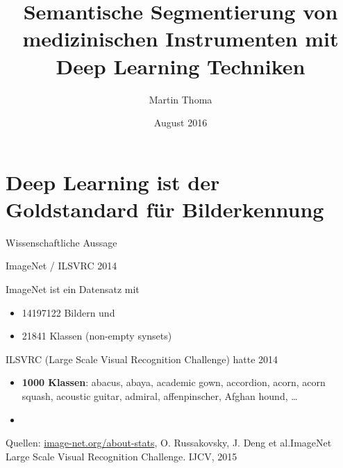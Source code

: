 \documentclass{beamer}
\begin{document}
\title{Semantische Segmentierung von medizinischen Instrumenten mit Deep Learning Techniken}
\author{Martin Thoma}
\date{August 2016}
\subject{Computer Science}


\section{Deep Learning ist der Goldstandard für Bilderkennung}
\begin{frame}[plain]{Wissenschaftliche Aussage}
\begin{center}






\end{center}
\end{frame}

\begin{frame}[plain]{ImageNet / ILSVRC 2014}

ImageNet ist ein Datensatz mit
\begin{itemize}
    \item \num{14197122} Bildern und
    \item \num{21841} Klassen (non-empty synsets)
\end{itemize}



ILSVRC (Large Scale Visual Recognition Challenge) hatte 2014

\begin{itemize}
    \item \textbf{1000 Klassen}: abacus, abaya, academic gown, accordion,
    acorn, acorn squash, acoustic guitar, admiral, affenpinscher, Afghan hound,
    \dots
    \item 
\end{itemize}

Quellen: \href{http://image-net.org/about-stats}{image-net.org/about-stats},
O. Russakovsky, J. Deng et al.ImageNet Large Scale Visual Recognition Challenge. IJCV, 2015
\end{frame}
\end{document}
